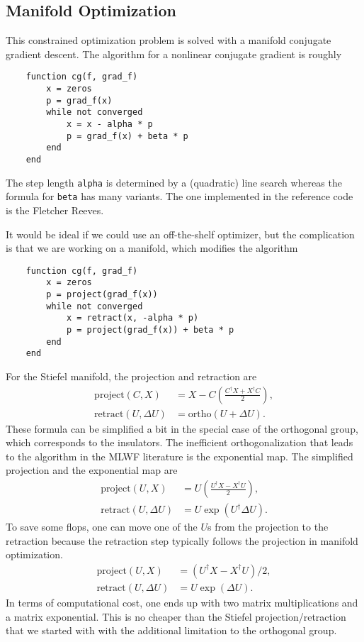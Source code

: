 \documentclass[a4paper, 12pt]{article}
\begin{document}
\subsection{Manifold Optimization}%
\label{sub:Manifold Optimization}


This constrained optimization problem is solved with a manifold conjugate
gradient descent. The algorithm for a nonlinear conjugate gradient is roughly
\vspace{-0.5cm}
\begin{verbatim}
    function cg(f, grad_f)
        x = zeros
        p = grad_f(x)
        while not converged
            x = x - alpha * p
            p = grad_f(x) + beta * p
        end
    end
\end{verbatim}
\vspace{-0.5cm}
The step length \texttt{alpha} is determined by a (quadratic) line search
whereas the formula for \texttt{beta} has many variants.  The one implemented
in the reference code is the Fletcher Reeves.

It would be ideal if we could use an off-the-shelf optimizer, but the complication is 
that we are working on a manifold, which modifies the algorithm
\vspace{-0.5cm}
\begin{verbatim}
    function cg(f, grad_f)
        x = zeros
        p = project(grad_f(x))
        while not converged
            x = retract(x, -alpha * p)
            p = project(grad_f(x)) + beta * p
        end
    end
\end{verbatim}
\vspace{-0.5cm}

For the Stiefel manifold, the projection and retraction are
\begin{align}
    \mathrm{project}(C, X) &= X - C \left(\frac{C^{\dagger} X + X^{\dagger} C}{2} \right),\\
    \mathrm{retract}(U, \Delta U) &= \mathrm{ortho}(U + \Delta U).
\end{align}
These formula can be simplified a bit in the special case of the orthogonal
group, which corresponds to the insulators. The inefficient orthogonalization 
that leads to the algorithm in the MLWF literature is the exponential map. The simplified 
projection and the exponential map are
\begin{align}
    \mathrm{project}(U, X) &= U\left(\frac{ U^{\dagger} X -X^{\dagger} U }{2} \right),\\
    \mathrm{retract}(U, \Delta U) &= U \exp(U^{\dagger} \Delta U).
\end{align}
To save some flops, one can move one of the $U$s from the projection to the
retraction because the retraction step typically follows the projection in
manifold optimization.
\begin{align}
	\mathrm{project}(U, X) &= (U^{\dagger} X - X^{\dagger} U) / 2,\\
    \mathrm{retract}(U, \Delta U) &= U \exp(\Delta U).
\end{align}
In terms of computational cost, one ends up with two matrix multiplications and
a matrix exponential. This is no cheaper than the Stiefel projection/retraction
that we started with with the additional limitation to the orthogonal group.
\end{document}
